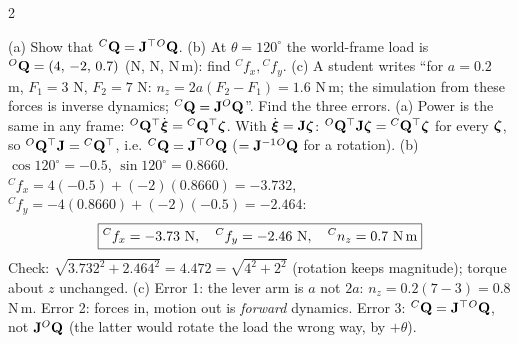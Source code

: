 \begin{multicols}{2}
\begin{examq}
(a) Show that ${}^{C}\mathbf Q=\mathbf J^\top{}^{O}\mathbf Q$. (b) At $\theta=120^\circ$ the world-frame load is ${}^{O}\mathbf Q=(4,\,-2,\,0.7)$ (N, N, N\,m): find ${}^Cf_x,{}^Cf_y$. (c) A student writes ``for $a=0.2$ m, $F_1=3$ N, $F_2=7$ N: $n_z=2a(F_2-F_1)=1.6$ N\,m; the simulation from these forces is inverse dynamics; ${}^{C}\mathbf Q=\mathbf J{}^{O}\mathbf Q$''. Find the three errors.
\solution
(a) Power is the same in any frame: ${}^{O}\mathbf Q^\top\dot{\boldsymbol\xi}={}^{C}\mathbf Q^\top\boldsymbol\zeta$. With $\dot{\boldsymbol\xi}=\mathbf J\boldsymbol\zeta$: ${}^{O}\mathbf Q^\top\mathbf J\boldsymbol\zeta={}^{C}\mathbf Q^\top\boldsymbol\zeta$ for every $\boldsymbol\zeta$, so ${}^{O}\mathbf Q^\top\mathbf J={}^{C}\mathbf Q^\top$, i.e. ${}^{C}\mathbf Q=\mathbf J^\top{}^{O}\mathbf Q$ ($=\mathbf J^{-1}{}^{O}\mathbf Q$ for a rotation).
(b) $\cos120^\circ=-0.5$, $\sin120^\circ=0.8660$. ${}^Cf_x=4(-0.5)+(-2)(0.8660)=-3.732$, ${}^Cf_y=-4(0.8660)+(-2)(-0.5)=-2.464$:
\[\boxed{{}^Cf_x=-3.73\ \text{N},\quad{}^Cf_y=-2.46\ \text{N},\quad{}^Cn_z=0.7\ \text{N\,m}}\]
Check: $\sqrt{3.732^2+2.464^2}=4.472=\sqrt{4^2+2^2}$ (rotation keeps magnitude); torque about $z$ unchanged.
(c) Error 1: the lever arm is $a$ not $2a$: $n_z=0.2(7-3)=0.8$ N\,m. Error 2: forces in, motion out is \emph{forward} dynamics. Error 3: ${}^{C}\mathbf Q=\mathbf J^\top{}^{O}\mathbf Q$, not $\mathbf J{}^{O}\mathbf Q$ (the latter would rotate the load the wrong way, by $+\theta$). \chk
\end{examq}
\end{multicols}
